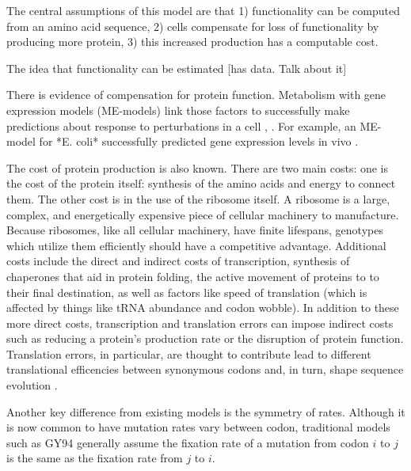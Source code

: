 \documentclass[12pt,letterpaper,fleqn]{article}
\begin{document}
{The central assumptions of this model are that 1) functionality can be computed from an amino acid sequence, 2) cells compensate for loss of functionality by producing more protein, 3) this increased production has a computable cost.

The idea that functionality can be estimated [has data. Talk about it]

There is evidence of compensation for protein function. Metabolism with gene expression models (ME-models) link those factors to successfully make predictions about response to perturbations in a cell \citep{https://www.nature.com/articles/ncomms1928}, \citep{https://www.sciencedirect.com/science/article/pii/S0958166914002316}. For example, an ME-model for *E. coli* successfully predicted gene expression levels in vivo \citep{http://journals.plos.org/plosone/article?id=10.1371/journal.pone.0045635}.

The cost of protein production is also known.
There are two main costs: one is the cost of the protein itself: synthesis of the amino acids and energy to connect them. The other cost is in the use of the ribosome itself.
A ribosome is a large, complex, and energetically expensive piece of cellular machinery to manufacture.
Because ribosomes, like all cellular machinery, have finite lifespans, genotypes which utilize them efficiently should have a competitive advantage.
Additional costs include the direct and indirect costs of transcription, synthesis of chaperones that aid in protein folding, the active movement of proteins to to their final destination, as well as factors like speed of translation (which is affected by things like tRNA abundance and codon wobble).
In addition to these more direct costs, transcription and translation errors can impose indirect costs such as reducing a protein's production rate or the disruption of protein function.
Translation errors, in particular, are thought to contribute lead to different translational efficencies between synonymous codons and, in turn, shape sequence evolution \citep{Kurland1991,Gilchrist2007,PlaceHolderRef}.

Another key difference from existing models is the symmetry of rates.
Although it is now common to have mutation rates vary between codon, traditional models such as GY94 generally assume the fixation rate of a mutation from codon $i$ to $j$ is the same as the fixation rate from $j$ to $i$.


}
\end{document}
